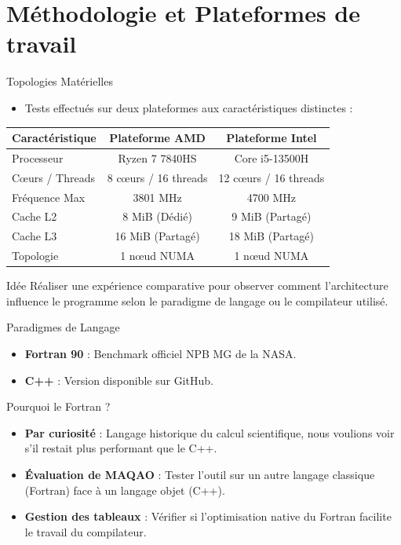 \section[Méthodologie]{Méthodologie et Plateformes de travail}

\begin{frame}{Topologies Matérielles}
    \begin{itemize}
        \item Tests effectués sur deux plateformes aux caractéristiques distinctes :
    \end{itemize}
    \begin{table}
        \footnotesize
        \centering
        \begin{tabular}{|l|c|c|}
            \hline
            \textbf{Caractéristique} & \textbf{Plateforme AMD} & \textbf{Plateforme Intel} \\ \hline
            Processeur & Ryzen 7 7840HS & Core i5-13500H \\ \hline
            Cœurs / Threads & 8 cœurs / 16 threads & 12 cœurs / 16 threads \\ \hline
            Fréquence Max & 3801 MHz & 4700 MHz \\ \hline
            Cache L2 & 8 MiB (Dédié) & 9 MiB (Partagé) \\ \hline
            Cache L3 & 16 MiB (Partagé) & 18 MiB (Partagé) \\ \hline
            Topologie & 1 nœud NUMA & 1 nœud NUMA \\ \hline
        \end{tabular}
    \end{table}
   \begin{block}{Idée}
        Réaliser une expérience comparative pour observer comment l'architecture influence le programme selon le paradigme de langage ou le compilateur utilisé.
    \end{block}
\end{frame}

\begin{frame}{Paradigmes de Langage}
    \begin{itemize}
        \item \textbf{Fortran 90} : Benchmark officiel NPB MG de la NASA.
        \item \textbf{C++} : Version disponible sur GitHub.
    \end{itemize}
    \begin{block}{Pourquoi le Fortran ?}
        \begin{itemize}
            \item \textbf{Par curiosité} : Langage historique du calcul scientifique, nous voulions voir s'il restait plus performant que le C++.
            \item \textbf{Évaluation de MAQAO} : Tester l'outil sur un autre langage classique (Fortran) face à un langage objet (C++).
            \item \textbf{Gestion des tableaux} : Vérifier si l'optimisation native du Fortran facilite le travail du compilateur.
        \end{itemize}
    \end{block} 
\end{frame}

